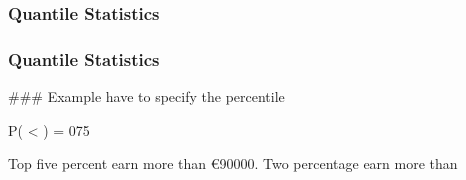 \begin{frame}[fragile]
\frametitle{Quantile Statistics}

\end{frame}
\begin{frame}[fragile]
\frametitle{Quantile Statistics}

\end{frame}
\begin{frame}[fragile]
### Example
have to specify the percentile

P( < ) = 075

Top five percent earn more than €90000.
Two percentage earn more than 

\end{frame}
